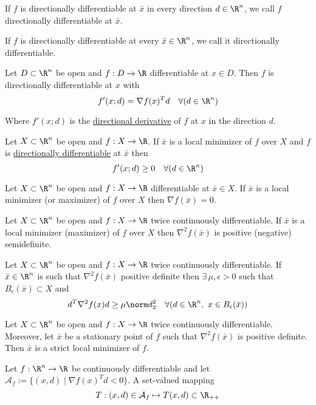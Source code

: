 If $f$ is directionally differentiable at $\bar x$ in every direction
$d\in\R^n$, we call $f$ directionally differentiable at $\bar x$.

If $f$ is directionally differentiable at every $\bar x\in\R^n$, we
call it directionally differentiable.


Let $D\subset \R^n$ be open and $f:D\to\R$
differentiable at $x\in D$. Then $f$ is directionally differentiable
at $x$ with
$$
	f'(x;d)=\nabla f(x)^Td\quad\forall(d\in\R^n)
$$

Where $f'(x;d)$ is the \hyperref[37eb747]{directional derivative} of
$f$ at $x$ in the direction $d$.


Let $X\subset\R^n$ be open and $f:X\to\R$. If $\bar x$ is a local
minimizer of $f$ over $X$ and $f$ is \hyperref[37eb747]{directionally
	differentiable} at $\bar x$ then
$$
	f'(x;d)\geq 0\quad\forall(d\in\R^n)
$$


Let $X\subset\R^n$ be open and $f:X\to\R$ differentiable at $\bar x\in
	X$. If $\bar x$ is a local minimizer (or maximizer) of $f$ over $X$
then $\nabla f(\bar x)=0$.


Let $X\subset\R^n$ be open and $f:X\to\R$ twice continuously
differentiable. If $\bar x$ is a local minimizer (maximizer) of $f$
over $X$ then $\nabla^2f(\bar x)$ is positive (negative) semidefinite.


Let $X\subset\R^n$ be open and $f:X\to\R$ twice continuously
differentiable. If $\bar x\in\R^n$ is such that $\nabla^2f(\bar x)$
positive definite then $\exists\,\mu,\epsilon>0$ such that
$B_\epsilon(\bar x)\subset X$ and
$$
	d^T\nabla^2f(x)d\geq\mu\norm d^2_2\quad\forall(d\in\R^n,\
	x\in B_\epsilon(\bar x))
$$


Let $X\subset\R^n$ be open and $f:X\to\R$ twice continuously
differentiable. Moreover, let $\bar x$ be a stationary point of $f$
such that $\nabla^2f(\bar x)$ is positive definite. Then $\bar x$ is a
strict local minimizer of $f$.

\label{ae4eac6}

Let $f:{\R}^n\to{\R}$ be continuously differentiable and
let $\mathcal A_f:=\{(x,d)\mid\nabla f(x)^Td<0\}$. A set-valued
mapping
$$
	T:(x,d)\in\mathcal A_f\mapsto T(x,d)\subset\R_{++}
$$

